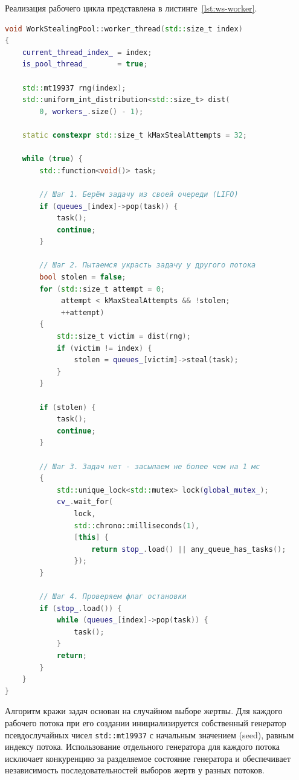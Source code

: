 Реализация рабочего цикла представлена
в листинге~\ref{lst:ws-worker}.

\begin{lstlisting}[language=C++,
                   caption={Рабочий цикл потока WorkStealingPool},
                   label={lst:ws-worker}]
void WorkStealingPool::worker_thread(std::size_t index)
{
    current_thread_index_ = index;
    is_pool_thread_       = true;

    std::mt19937 rng(index);
    std::uniform_int_distribution<std::size_t> dist(
        0, workers_.size() - 1);

    static constexpr std::size_t kMaxStealAttempts = 32;

    while (true) {
        std::function<void()> task;

        // Шаг 1. Берём задачу из своей очереди (LIFO)
        if (queues_[index]->pop(task)) {
            task();
            continue;
        }

        // Шаг 2. Пытаемся украсть задачу у другого потока
        bool stolen = false;
        for (std::size_t attempt = 0;
             attempt < kMaxStealAttempts && !stolen;
             ++attempt)
        {
            std::size_t victim = dist(rng);
            if (victim != index) {
                stolen = queues_[victim]->steal(task);
            }
        }

        if (stolen) {
            task();
            continue;
        }

        // Шаг 3. Задач нет - засыпаем не более чем на 1 мс
        {
            std::unique_lock<std::mutex> lock(global_mutex_);
            cv_.wait_for(
                lock,
                std::chrono::milliseconds(1),
                [this] {
                    return stop_.load() || any_queue_has_tasks();
                });
        }

        // Шаг 4. Проверяем флаг остановки
        if (stop_.load()) {
            while (queues_[index]->pop(task)) {
                task();
            }
            return;
        }
    }
}
\end{lstlisting}

Алгоритм кражи задач основан на случайном выборе жертвы.
Для каждого рабочего потока при его создании инициализируется
собственный генератор псевдослучайных чисел \texttt{std::mt19937}
с начальным значением (seed), равным индексу потока. Использование
отдельного генератора для каждого потока исключает конкуренцию
за разделяемое состояние генератора и обеспечивает независимость
последовательностей выборов жертв у разных потоков.

